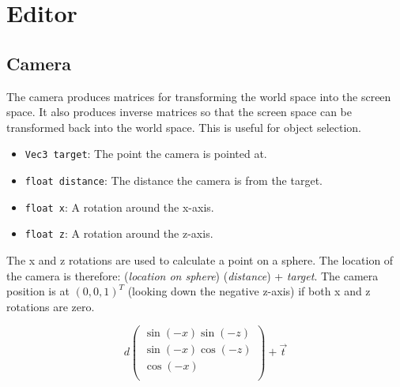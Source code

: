\documentclass[10pt]{article}
\begin{document}
\pagebreak
\section{Editor}
\subsection{Camera}
The camera produces matrices for transforming the world space into the screen space. It also produces inverse matrices so that the screen space can be transformed back into the world space. This is useful for object selection.
\begin{itemize}
\item \texttt{Vec3 target}: The point the camera is pointed at.
\item \texttt{float distance}: The distance the camera is from the target.
\item \texttt{float x}: A rotation around the x-axis.
\item \texttt{float z}: A rotation around the z-axis.
\end{itemize}
The x and z rotations are used to calculate a point on a sphere. The location of the camera is therefore: (\textit{location on sphere}) (\textit{distance}) + \textit{target}. The camera position is at $ (0, 0, 1)^T $ (looking down the negative z-axis) if both x and z rotations are zero.

\[
d\begin{pmatrix}
\sin(-x)\sin(-z)\\
\sin(-x)\cos(-z)\\
\cos(-x)\\
\end{pmatrix} + \vec{t}
\]
\end{document}
